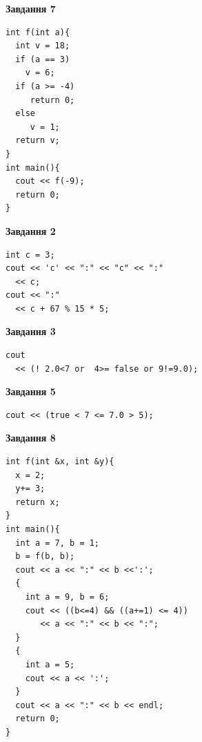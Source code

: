 \documentclass[12pt, ukrainian]{article}
\begin{document}
{\begin {large}
\begin{minipage}[t]{7.0cm}
\begin{center}
\textbf{Завдання 7}
\end{center}
\vspace{-8mm}

\begin{verbatim}
int f(int a){
  int v = 18;
  if (a == 3)
    v = 6;
  if (a >= -4)
     return 0;
  else
     v = 1;
  return v;
}
int main(){
  cout << f(-9);
  return 0;
}
\end{verbatim}

\end{minipage}
\vline \hspace{1mm}
\begin{minipage}[t]{11.0cm}

\begin{center}
\textbf{Завдання 2}
\end{center}
\vspace{-8mm}

\begin{verbatim}
int c = 3;
cout << 'c' << ":" << "c" << ":" 
  << c;
cout << ":" 
  << c + 67 % 15 * 5;
\end{verbatim}



\begin{center}
\textbf{Завдання 3}
\end{center}
\vspace{-8mm}

\begin{verbatim}
cout 
  << (! 2.0<7 or  4>= false or 9!=9.0);
\end{verbatim}



\begin{center}
\textbf{Завдання 5}
\end{center}
\vspace{-8mm}

\begin{verbatim}
cout << (true < 7 <= 7.0 > 5);
\end{verbatim}



\begin{center}
\textbf{Завдання 8}
\end{center}
\vspace{-8mm}

\begin{verbatim}
int f(int &x, int &y){
  x = 2;
  y+= 3;
  return x;
}
int main(){
  int a = 7, b = 1;
  b = f(b, b);
  cout << a << ":" << b <<':';
  {
    int a = 9, b = 6;
    cout << ((b<=4) && ((a+=1) <= 4))
       << a << ":" << b << ":";
  }
  {
    int a = 5;
    cout << a << ':';
  }
  cout << a << ":" << b << endl;
  return 0;
}
\end{verbatim}


\end{minipage}
\end{large}}
\end{document}

